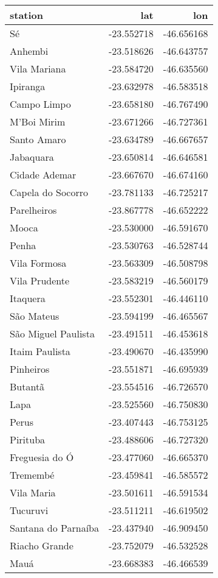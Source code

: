 \begin{tabular}{lrr}
\toprule
            station &        lat &        lon \\
\midrule
                 Sé & -23.552718 & -46.656168 \\
            Anhembi & -23.518626 & -46.643757 \\
       Vila Mariana & -23.584720 & -46.635560 \\
           Ipiranga & -23.632978 & -46.583518 \\
        Campo Limpo & -23.658180 & -46.767490 \\
        M'Boi Mirim & -23.671266 & -46.727361 \\
        Santo Amaro & -23.634789 & -46.667657 \\
          Jabaquara & -23.650814 & -46.646581 \\
      Cidade Ademar & -23.667670 & -46.674160 \\
  Capela do Socorro & -23.781133 & -46.725217 \\
        Parelheiros & -23.867778 & -46.652222 \\
              Mooca & -23.530000 & -46.591670 \\
              Penha & -23.530763 & -46.528744 \\
       Vila Formosa & -23.563309 & -46.508798 \\
      Vila Prudente & -23.583219 & -46.560179 \\
           Itaquera & -23.552301 & -46.446110 \\
         São Mateus & -23.594199 & -46.465567 \\
São Miguel Paulista & -23.491511 & -46.453618 \\
     Itaim Paulista & -23.490670 & -46.435990 \\
          Pinheiros & -23.551871 & -46.695939 \\
            Butantã & -23.554516 & -46.726570 \\
               Lapa & -23.525560 & -46.750830 \\
              Perus & -23.407443 & -46.753125 \\
           Pirituba & -23.488606 & -46.727320 \\
     Freguesia do Ó & -23.477060 & -46.665370 \\
           Tremembé & -23.459841 & -46.585572 \\
         Vila Maria & -23.501611 & -46.591534 \\
           Tucuruvi & -23.511211 & -46.619502 \\
Santana do Parnaíba & -23.437940 & -46.909450 \\
      Riacho Grande & -23.752079 & -46.532528 \\
               Mauá & -23.668383 & -46.466539 \\
\bottomrule
\end{tabular}
